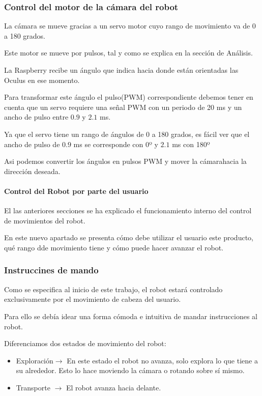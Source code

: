 \documentclass[twoside, 12pt]{epstfg}
\begin{document}
\subsubsection{Control del motor de la cámara del robot}

La cámara se mueve gracias a un servo motor cuyo rango de movimiento va de 0 a 180 grados.

Este motor se mueve por pulsos, tal y como se explica en la sección de Análisis.

La Raspberry recibe un ángulo que indica hacia donde están orientadas las Oculus en ese momento.

Para transformar este ángulo el pulso(PWM) correspondiente debemos tener en cuenta que un servo requiere una señal PWM con un periodo de 20 ms y un ancho de pulso entre $0.9$ y $2.1$ ms.

Ya que el servo tiene un rango de ángulos de 0 a 180 grados, es fácil ver que el ancho de pulso de $0.9$ ms se corresponde con 0º y $2.1$ ms con 180º

Asi podemos convertir los ángulos en pulsos PWM y mover la cámarahacia la dirección deseada.

\paragraph{Control del Robot por parte del usuario}

El las anteriores secciones se ha explicado el funcionamiento interno del control de movimientos del robot.

En este nuevo apartado se presenta cómo debe utilizar el usuario este producto, qué rango dde movimiento tiene y cómo puede hacer avanzar el robot.

\subsubsection{Instruccines de mando}

Como se especifica al inicio de este trabajo, el robot estará controlado exclusivamente por el movimiento de cabeza del usuario.

Para ello se debía idear una forma cómoda e intuitiva de mandar instrucciones al robot.

Diferenciamos dos estados de movimiento del robot:
\begin{itemize}
	\item Exploración$\rightarrow$ En este estado el robot no avanza, solo explora lo que tiene a su alrededor. Esto lo hace moviendo la cámara o rotando sobre sí mismo.
	\item Transporte $\rightarrow$ El robot avanza hacia delante.
\end{itemize}
\end{document}
